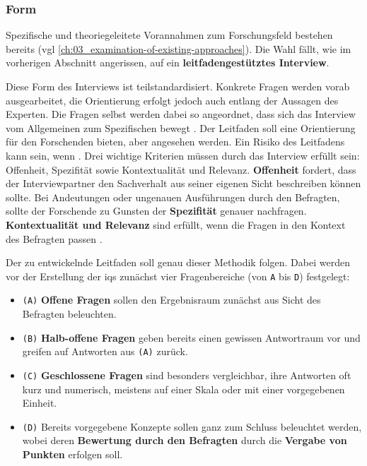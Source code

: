 \subsubsection{Form}
\label{subsubsec:04-01-02-02_form}

Spezifische und theoriegeleitete Vorannahmen zum Forschungsfeld bestehen bereits (\acrshort{vgl} \autoref{ch:03_examination-of-existing-approaches}). Die Wahl fällt, wie im vorherigen Abschnitt angerissen, auf ein \textbf{leitfadengestütztes Interview}.

Diese Form des Interviews ist teilstandardisiert. Konkrete Fragen werden vorab ausgearbeitet, die Orientierung erfolgt jedoch auch entlang der Aussagen des Experten. Die Fragen selbst werden dabei so angeordnet, dass sich das Interview vom Allgemeinen zum Spezifischen bewegt \cite{205:Leitfadengestuetztes-Interview}. Der Leitfaden soll eine Orientierung für den Forschenden bieten, aber  \cite{401:Das-Experteninterview} angesehen werden. Ein Risiko des Leitfadens kann sein, wenn  \cite{401:Das-Experteninterview}. Drei wichtige Kriterien müssen durch das Interview erfüllt sein: Offenheit, Spezifität sowie Kontextualität und Relevanz. \textbf{Offenheit} fordert, dass der Interviewpartner den Sachverhalt aus seiner eigenen Sicht beschreiben können sollte. Bei Andeutungen oder ungenauen Ausführungen durch den Befragten, sollte der Forschende zu Gunsten der \textbf{Spezifität} genauer nachfragen. \textbf{Kontextualität und Relevanz} sind erfüllt, wenn die Fragen in den Kontext des Befragten passen \cite{205:Leitfadengestuetztes-Interview}.

Der zu entwickelnde Leitfaden soll genau dieser Methodik folgen. Dabei werden vor der Erstellung der \Glspl{iq} zunächst vier Fragenbereiche (von \texttt{A} bis \texttt{D}) festgelegt:

\begin{itemize}
    \item \texttt{(A)} \textbf{Offene Fragen} sollen den Ergebnisraum zunächst aus Sicht des Befragten beleuchten.
    \item \texttt{(B)} \textbf{Halb-offene Fragen} geben bereits einen gewissen Antwortraum vor und greifen auf Antworten aus \texttt{(A)} zurück.
    \item \texttt{(C)} \textbf{Geschlossene Fragen} sind besonders vergleichbar, ihre Antworten oft kurz und numerisch, meistens auf einer Skala oder mit einer vorgegebenen Einheit.
    \item \texttt{(D)} Bereits vorgegebene Konzepte sollen ganz zum Schluss beleuchtet werden, wobei deren \textbf{Bewertung durch den Befragten} durch die \textbf{Vergabe von Punkten} erfolgen soll.
\end{itemize}

